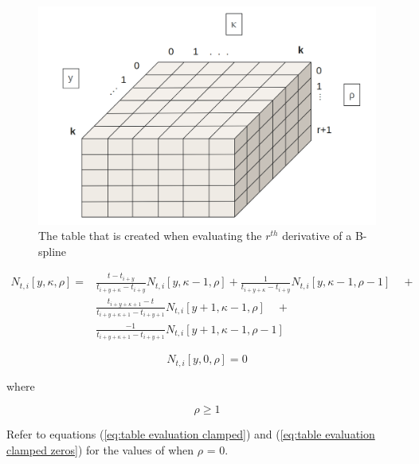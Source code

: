 \documentclass{article}
\begin{document}
\begin{figure}[H]
\begin{center}
\includegraphics[scale=.25]{tableDerivatives.png}
\end{center}
\caption{The table that is created when evaluating the \(r^{th}\) derivative of a B-spline}
\label{Fig:Derivative Table}
\end{figure}

 \begin{equation} \label{eq:Basis function table derivative equation}
 \begin{aligned}
  N_{t,i}[y,\kappa, \rho] = & 
  \frac{t - t_{i+y}}{t_{i+y+\kappa} - t_{i+y}} N_{t,i}[y,\kappa-1,\rho] + \frac{1}{t_{i+y+\kappa} - t_{i+y}} N_{t,i}[y,\kappa-1,\rho-1] \quad + \\
   & \frac{t_{i+y+\kappa+1} - t}{t_{i+y+\kappa+1}-t_{i+y+1}} N_{t,i}[y+1 , \kappa-1, \rho] \quad + \\ & \frac{-1}{t_{i+y+\kappa+1}-t_{i+y+1}} N_{t,i}[y+1 , \kappa-1, \rho-1]
 \end{aligned}
  \end{equation}
  
\hspace{1cm}
  
  \begin{equation}
      N_{t,i}[y,0,\rho] = 0
  \end{equation}
  
  where
  
  \begin{equation}
      \rho \geq 1
  \end{equation}
  
 Refer to equations (\ref{eq:table evaluation clamped}) and (\ref{eq:table evaluation clamped zeros}) for the values of  when \(\rho\) = 0.
  
\end{document}
